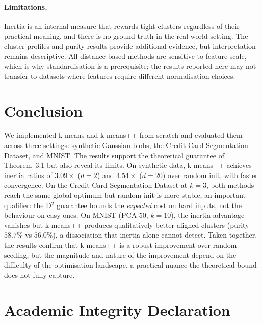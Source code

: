 \documentclass[11pt,a4paper]{article}
\begin{document}
\paragraph{Limitations.}
Inertia is an internal measure that rewards tight clusters regardless of their
practical meaning, and there is no ground truth in the real-world setting.
The cluster profiles and purity results provide additional evidence, but
interpretation remains descriptive.
All distance-based methods are sensitive to feature scale, which is why
standardisation is a prerequisite; the results reported here may not transfer
to datasets where features require different normalisation choices.

\section{Conclusion}

We implemented k-means and k-means++ from scratch and evaluated them across
three settings: synthetic Gaussian blobs, the Credit Card Segmentation Dataset,
and MNIST.
The results support the theoretical guarantee of Theorem~3.1 but also reveal
its limits.
On synthetic data, k-means++ achieves inertia ratios of $3.09\times$ ($d=2$)
and $4.54\times$ ($d=20$) over random init, with faster convergence.
On the Credit Card Segmentation Dataset at $k=3$, both methods reach the same global optimum but random
init is more stable, an important qualifier: the D$^2$ guarantee bounds
the \emph{expected} cost on hard inputs, not the behaviour on easy ones.
On MNIST (PCA-50, $k=10$), the inertia advantage vanishes but k-means++
produces qualitatively better-aligned clusters (purity $58.7\%$ vs $56.0\%$),
a dissociation that inertia alone cannot detect.
Taken together, the results confirm that k-means++ is a robust improvement
over random seeding, but the magnitude and nature of the improvement depend
on the difficulty of the optimisation landscape, a practical nuance the
theoretical bound does not fully capture.

\section*{Academic Integrity Declaration}
\end{document}
